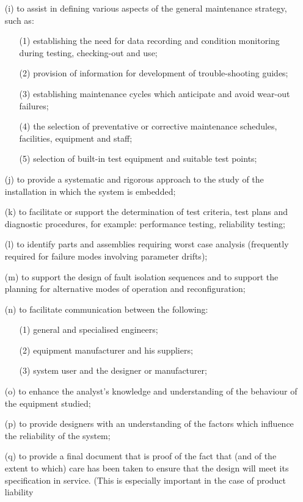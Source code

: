 \documentclass[./dissertation.tex]{subfiles}
\begin{document}
\begin{enumerate}
\item[(i)] to assist in defining various aspects of the general maintenance strategy, such as:
\begin{enumerate}
\item[(1)] establishing the need for data recording and condition monitoring during testing, checking-out and use;
\item[(2)] provision of information for development of trouble-shooting guides;
\item[(3)] establishing maintenance cycles which anticipate and avoid wear-out failures;
\item[(4)] the selection of preventative or corrective maintenance schedules, facilities, equipment and staff;
\item[(5)] selection of built-in test equipment and suitable test points;
\end{enumerate}
\item[(j)] to provide a systematic and rigorous approach to the study of the installation in which the system is embedded;
\item[(k)] to facilitate or support the determination of test criteria, test plans and diagnostic procedures, for example: performance testing, reliability testing;
\item[(l)] to identify parts and assemblies requiring worst case analysis (frequently required for failure modes involving parameter drifts);
\item[(m)] to support the design of fault isolation sequences and to support the planning for alternative modes of operation and reconfiguration;
\item[(n)] to facilitate communication between the following:
\begin{enumerate}
\item[(1)] general and specialised engineers;
\item[(2)] equipment manufacturer and his suppliers;
\item[(3)] system user and the designer or manufacturer;
\end{enumerate}
\item[(o)] to enhance the analyst's knowledge and understanding of the behaviour of the equipment studied;
\item[(p)] to provide designers with an understanding of the factors which influence the reliability of the system;
\item[(q)] to provide a final document that is proof of the fact that (and of the extent to which) care has been taken to ensure that the design will meet its specification in service. (This is especially important in the case of product liability 
\end{enumerate}
\end{document}
